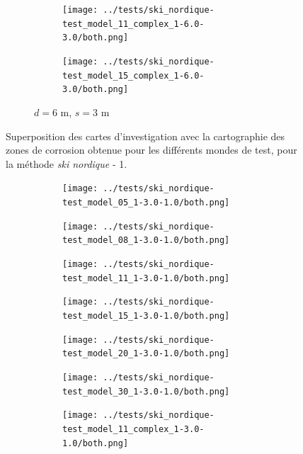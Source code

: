 \documentclass[francais,RandD]{rapportPFE}
\begin{document}
\begin{figure}[H]
\begin{subfigure}[t]{\linewidth}
\begin{subfigure}[t]{0.11\linewidth}
					\texttt{[image: ../tests/ski\_nordique-test\_model\_11\_complex\_1-6.0-3.0/both.png]}
				\end{subfigure}
				\hfill
				\begin{subfigure}[t]{0.11\linewidth}
					\texttt{[image: ../tests/ski\_nordique-test\_model\_15\_complex\_1-6.0-3.0/both.png]}
				\end{subfigure}
				\caption{$d = 6$ m, $s = 3$ m}
			\end{subfigure}
			\caption{Superposition des cartes d'investigation avec la cartographie des zones de corrosion obtenue pour les différents mondes de test, pour la méthode \textit{ski nordique} - 1.}
			\label{fig:ski_nordique_resultats}
		\end{figure}

		\begin{figure}[H]
			\centering
			\begin{subfigure}[t]{\linewidth}
				\centering
				\begin{subfigure}[t]{0.11\linewidth}
					\texttt{[image: ../tests/ski\_nordique-test\_model\_05\_1-3.0-1.0/both.png]}
				\end{subfigure}
				\hfill
				\begin{subfigure}[t]{0.11\linewidth}
					\texttt{[image: ../tests/ski\_nordique-test\_model\_08\_1-3.0-1.0/both.png]}
				\end{subfigure}
				\hfill
				\begin{subfigure}[t]{0.11\linewidth}
					\texttt{[image: ../tests/ski\_nordique-test\_model\_11\_1-3.0-1.0/both.png]}
				\end{subfigure}
				\hfill
				\begin{subfigure}[t]{0.11\linewidth}
					\texttt{[image: ../tests/ski\_nordique-test\_model\_15\_1-3.0-1.0/both.png]}
				\end{subfigure}
				\hfill
				\begin{subfigure}[t]{0.11\linewidth}
					\texttt{[image: ../tests/ski\_nordique-test\_model\_20\_1-3.0-1.0/both.png]}
				\end{subfigure}
				\hfill
				\begin{subfigure}[t]{0.11\linewidth}
					\texttt{[image: ../tests/ski\_nordique-test\_model\_30\_1-3.0-1.0/both.png]}
				\end{subfigure}
				\hfill
				\begin{subfigure}[t]{0.11\linewidth}
					\texttt{[image: ../tests/ski\_nordique-test\_model\_11\_complex\_1-3.0-1.0/both.png]}
				\end{subfigure}

\end{subfigure}
\end{figure}
\end{document}
